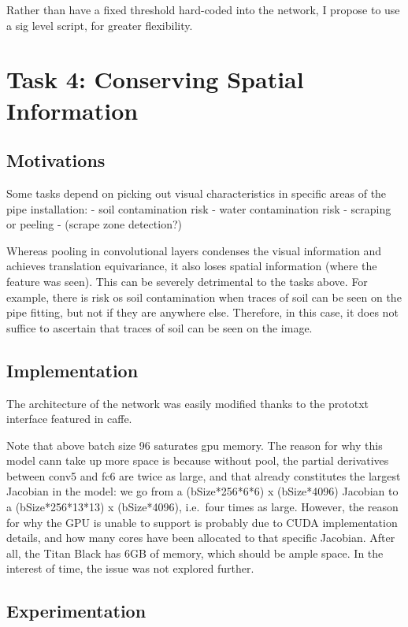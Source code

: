 \documentclass[a4paper,11pt]{article}
\begin{document}
Rather than have a fixed threshold hard-coded into the network, I propose to use a sig level script, for greater flexibility. \\


\section{Task 4: Conserving Spatial Information}

\subsection{Motivations}

Some tasks depend on picking out visual characteristics in specific areas of the pipe installation:
- soil contamination risk
- water contamination risk
- scraping or peeling
- (scrape zone detection?)

Whereas pooling in convolutional layers condenses the visual information and achieves translation equivariance, it also loses spatial information (where the feature was seen). This can be severely detrimental to the tasks above. For example, there is risk os soil contamination when traces of soil can be seen on the pipe fitting, but not if they are anywhere else. Therefore, in this case, it does not suffice to ascertain that traces of soil can be seen on the image. \\

\subsection{Implementation}

The architecture of the network was easily modified thanks to the prototxt interface featured in caffe. 

Note that above batch size 96 saturates gpu memory. The reason for why this model cann take up more space is because without pool, the partial derivatives between conv5 and fc6 are twice as large, and that already constitutes the largest Jacobian in the model: we go from a (bSize*256*6*6) x (bSize*4096) Jacobian to a (bSize*256*13*13) x (bSize*4096), i.e.\ four times as large. However, the reason for why the GPU is unable to support is probably due to CUDA implementation details, and how many cores have been allocated to that specific Jacobian. After all, the Titan Black has 6GB of memory, which should be ample space. In the interest of time, the issue was not explored further. 

\subsection{Experimentation}
\end{document}

